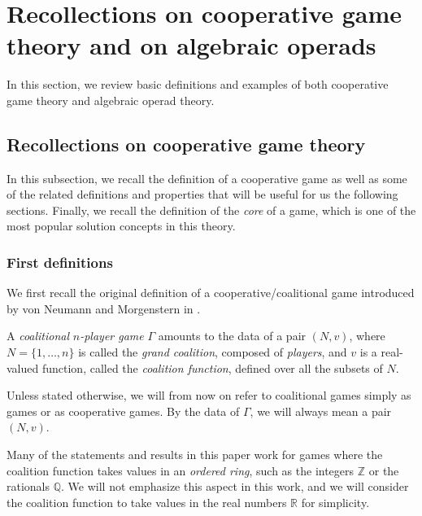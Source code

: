 \documentclass[a4paper,12pt]{amsart}
\begin{document}
\vspace{1.5pc}

\section{Recollections on cooperative game theory and on algebraic operads}

\vspace{2pc}

In this section, we review basic definitions and examples of both cooperative game theory and algebraic operad theory. 

\subsection{Recollections on cooperative game theory} In this subsection, we recall the definition of a cooperative game as well as some of the related definitions and properties that will be useful for us the following sections. Finally, we recall the definition of the \textit{core} of a game, which is one of the most popular solution concepts in this theory. 

\subsubsection{First definitions} We first recall the original definition of a cooperative/coalitional game introduced by von Neumann and Morgenstern in \cite{vonNeumann2}.

\begin{definition}
A \emph{coalitional} $n$\textit{-player game} $\Gamma$ amounts to the data of a pair $(N, v)$, where $N = \{1, \ldots, n\}$  is called the \emph{grand coalition}, composed of \textit{players}, and $v$ is a real-valued function, called the \emph{coalition function}, defined over all the subsets of $N$.
\end{definition}

\begin{notation}
Unless stated otherwise, we will from now on refer to coalitional games simply as games or as cooperative games. By the data of $\Gamma$, we will always mean a pair $(N, v)$. 
\end{notation}

\begin{remark}
Many of the statements and results in this paper work for games where the coalition function takes values in an \textit{ordered ring}, such as the integers $\mathbb{Z}$ or the rationals $\mathbb{Q}$. We will not emphasize this aspect in this work, and we will consider the coalition function to take values in the real numbers $\mathbb{R}$ for simplicity.
\end{remark}
\end{document}
